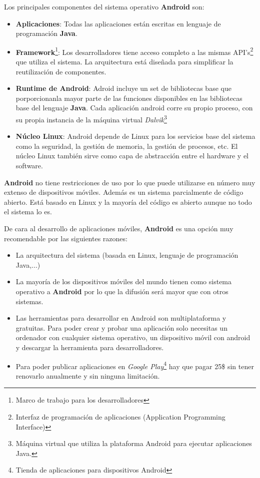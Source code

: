 \bigskip
Los principales componentes del sistema operativo \textbf{Android} son:


\begin{itemize}
  \item \textbf{Aplicaciones}: Todas las aplicaciones están escritas en lenguaje de programación \textbf{Java}.
  \item \textbf{Framework}\footnote{Marco de trabajo para los desarrolladores}: Los desarrolladores tiene acceso completo a las mismas API's\footnote{Interfaz de programación de aplicaciones (Application Programming Interface)} que utiliza el sistema. La arquitectura está diseñada para simplificar la reutilización de componentes.
  \item \textbf{Runtime de Android}: Adroid incluye un set de bibliotecas base que porporcionanla mayor parte de las funciones disponibles en las bibliotecas base del lenguaje \textbf{Java}. Cada aplicación android corre su propio proceso, con su propia instancia de la máquina virtual \textit{Dalvik}\footnote{Máquina virtual que utiliza la plataforma Android para ejecutar aplicaciones Java.}
  \item \textbf{Núcleo Linux}: Android depende de Linux para los servicios base del sistema como la seguridad, la gestión de memoria, la gestión de procesos, etc. El núcleo Linux también sirve como capa de abstracción entre el hardware y el software.
\end{itemize}

\bigskip
\textbf{Android} no tiene restricciones de uso por lo que puede utilizarse en número muy extenso de dispositivos móviles. Además es un sistema parcialmente de código abierto. Está basado en Linux y la mayoría del código es abierto aunque no todo el sistema lo es.

\bigskip
De cara al desarrollo de aplicaciones móviles, \textbf{Android} es una opción muy recomendable por las siguientes razones:

\begin{itemize}
  \item La arquitectura del sistema (basada en Linux, lenguaje de programación Java,...)
  \item La mayoría de los dispositivos móviles del mundo tienen como sistema operativo a \textbf{Android} por lo que la difusión será mayor que con otros sistemas.
  \item Las herramientas para desarrollar en Android son multiplataforma y gratuitas. Para poder crear y probar una aplicación solo necesitas un ordenador con cualquier sistema operativo, un dispositivo móvil con android y descargar la herramienta para desarrolladores.
  \item Para poder publicar aplicaciones en \textit{Google Play}\footnote{Tienda de aplicaciones para dispositivos Android} hay que pagar 25\$ sin tener renovarlo anualmente y sin ninguna limitación.
\end{itemize}